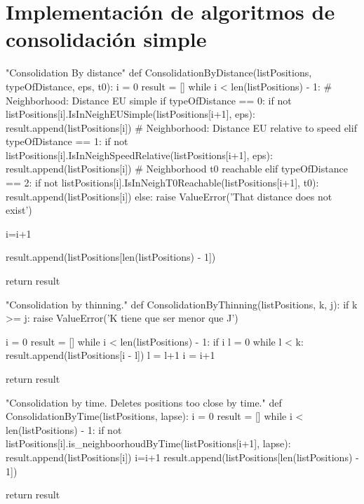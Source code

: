 \documentclass[a4paper, 12pt]{article}
\begin{document}
\newpage

\appendix

\section{Implementaci\'on de algoritmos de consolidaci\'on simple}\label{App:AppendixA}

\begin{python}[caption=Consolidaci\'on por distancia]\label{App:ConsByDistance}
"Consolidation By distance"
def ConsolidationByDistance(listPositions, typeOfDistance, eps, t0):
	i = 0
	result = []
	while i < len(listPositions) - 1:
		# Neighborhood: Distance EU simple
		if typeOfDistance == 0:
			if not listPositions[i].IsInNeighEUSimple(listPositions[i+1], eps):
				result.append(listPositions[i])
		# Neighborhood: Distance EU relative to speed
		elif typeOfDistance == 1:
			if not listPositions[i].IsInNeighSpeedRelative(listPositions[i+1], eps):
				result.append(listPositions[i])
		# Neighborhood t0 reachable
		elif typeOfDistance == 2:
			if not listPositions[i].IsInNeighT0Reachable(listPositions[i+1], t0):
				result.append(listPositions[i])
		else:
			raise ValueError('That distance does not exist')

		i=i+1

	result.append(listPositions[len(listPositions) - 1])

	return result

\end{python}


\newpage

\begin{python}[caption=Consolidaci\'on por adelgazamiento]\label{App:ConsByThinnig}
"Consolidation by thinning."
def ConsolidationByThinning(listPositions, k, j):
	if k >= j:
		raise ValueError('K tiene que ser menor que J')
        
	i = 0
	result = []
	while i < len(listPositions) - 1:
		if i%
			l = 0
			while l < k:
				result.append(listPositions[i - l])
				l = l+1
			i = i+1

	return result
\end{python}

\newpage

\begin{python}[caption=Consolidaci\'on por tiempo]\label{App:ConsByTime}
"Consolidation by time. Deletes positions too close by time."
def ConsolidationByTime(listPositions, lapse):
	i = 0
	result = []
	while i < len(listPositions) - 1:
		if not listPositions[i].is_neighboorhoudByTime(listPositions[i+1], lapse):
			result.append(listPositions[i])
		i=i+1
	result.append(listPositions[len(listPositions) - 1])

	return result
\end{python}
\end{document}
